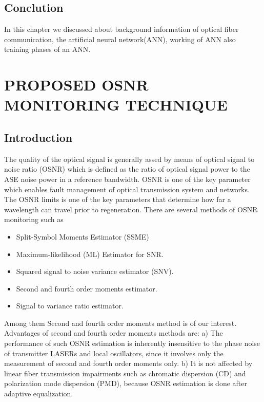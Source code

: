 \documentclass[12pt]{report}
\begin{document}
\section{Conclution}
In this chapter we discussed about background information of optical fiber communication, the artificial neural network(ANN), working of ANN also training phases of an ANN.

\chapter{PROPOSED OSNR MONITORING TECHNIQUE}
\section{Introduction}
The quality of the optical signal is generally assed by means of optical signal to noise ratio (OSNR) which is defined as the ratio of optical signal power to the ASE noise power in a reference bandwidth. OSNR is one of the key parameter which enables fault management of optical transmission system and networks. The OSNR limits is one of the key parameters that determine how far a wavelength can travel prior to regeneration. There are several methods of OSNR monitoring such as
\begin{itemize}
	\item Split-Symbol Moments Estimator (SSME)
	\item Maximum-likelihood (ML) Estimator for SNR.
	\item Squared signal to noise variance estimator (SNV).
	\item Second and fourth order moments estimator.
	\item Signal to variance ratio estimator.
\end{itemize}
Among them Second and fourth order moments method is of our interest. Advantages of second and fourth order moments methods are:
a) The performance of such OSNR estimation is inherently insensitive to the phase noise of transmitter LASERs and local oscillators, since it involves only the measurement of second and fourth order moments only.
b) It is not affected by linear fiber transmission impairments such as chromatic dispersion (CD) and polarization mode dispersion (PMD), because OSNR estimation is done after adaptive equalization.
\end{document}
